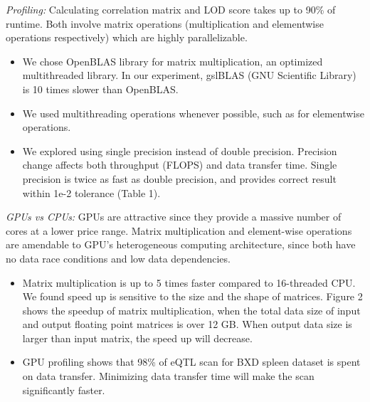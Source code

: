 \documentclass[9pt,twocolumn,twoside,lineno]{gsag3jnl}
\begin{document}
{\em Profiling:} Calculating correlation matrix and LOD score
takes up to 90\% of runtime.  Both involve matrix operations
(multiplication and elementwise operations respectively) which
are highly parallelizable.
      \begin{itemize}
	\item We chose OpenBLAS library for matrix multiplication, an
	optimized multithreaded library.  In our experiment, gslBLAS
	(GNU Scientific Library) is 10 times slower than OpenBLAS.
	\item We used multithreading operations whenever possible, such as
	for elementwise operations.
	\item We explored using single precision instead of double
	precision.  Precision change affects both throughput (FLOPS) and
	data transfer time.  Single precision is twice
	as fast as double precision, and provides correct result	 
	within 1e-2 tolerance (Table 1).
\end{itemize}

 {\em GPUs vs CPUs:} GPUs are attractive since they provide a
massive number of cores at a lower price range.
Matrix multiplication and element-wise operations are amendable
to GPU's heterogeneous computing architecture, since both have
no data race conditions and low data dependencies.


\begin{itemize}
	\item Matrix multiplication is up to 5 times faster
	compared to 16-threaded CPU.
	We found speed
	up is sensitive to the size and the shape of matrices.
	Figure 2 shows the speedup of matrix
	multiplication, when the total data size of input and output
	floating point matrices is over 12 GB.
	When output data size is
	larger than input matrix, the speed up will decrease. 
	\item  GPU profiling shows that 98\% of eQTL scan for BXD
	spleen dataset is spent on data transfer.
	Minimizing data transfer time will make the scan significantly
	faster.
\end{itemize}
\end{document}
